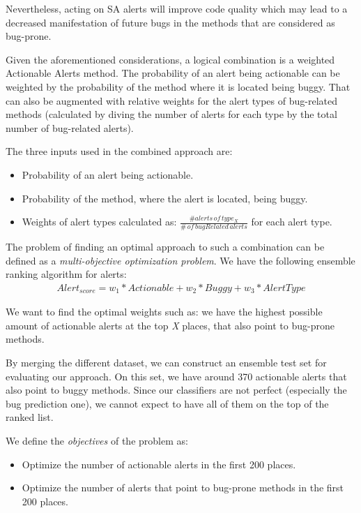 Nevertheless, acting on SA alerts will improve code quality which may lead to a decreased manifestation of future bugs in the methods that are considered as bug-prone.

Given the aforementioned considerations, a logical combination is a weighted Actionable Alerts method. The probability of an alert being actionable can be weighted by the probability of the method where it is located being buggy. That can also be augmented with relative weights for the alert types of bug-related methods (calculated by diving the number of alerts for each type by the total number of bug-related alerts).

The three inputs used in the combined approach are:
\begin{itemize}
	\item Probability of an alert being actionable.
	\item Probability of the method, where the alert is located, being buggy.
	\item Weights of alert types calculated as: $\frac{\#alerts \, of \, type_X}{\# \, of \, bugRelated \, alerts}$ for each alert type.
\end{itemize}

The problem of finding an optimal approach to such a combination can be defined as a \textit{multi-objective optimization problem}. We have the following ensemble ranking algorithm for alerts:
\begin{gather*}
Alert_{score} = w_{1} * Actionable + w_{2} * Buggy + w_{3} * AlertType
\end{gather*}

We want to find the optimal weights such as: we have the highest possible amount of actionable alerts at the top \textit{X} places, that also point to bug-prone methods.

By merging the different dataset, we can construct an ensemble test set for evaluating our approach. On this set, we have around 370 actionable alerts that also point to buggy methods. Since our classifiers are not perfect (especially the bug prediction one), we cannot expect to have all of them on the top of the ranked list.

We define the \textit{objectives} of the problem as:
\begin{itemize}
	\item Optimize the number of actionable alerts in the first 200 places.
	\item Optimize the number of alerts that point to bug-prone methods in the first 200 places.
\end{itemize}

